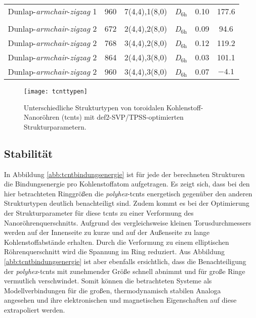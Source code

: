 \begin{table}[htbp!]
{\begin{tabular}{lccccS[table-format = 3.1]}
    Dunlap-\textit{armchair}-\textit{zigzag} 1& 960   & 7(4,4),1(8,0) & \textit{D}$_{6\text{h}}$   & 0.10  & 177.6 \\
          &       &       &       &       &  \\
    Dunlap-\textit{armchair}-\textit{zigzag} 2& 672   & 2(4,4),2(8,0) & \textit{D}$_{6\text{h}}$   & 0.09  & 94.6 \\
    Dunlap-\textit{armchair}-\textit{zigzag} 2& 768   & 3(4,4),2(8,0) & \textit{D}$_{6\text{h}}$   & 0.12  & 119.2 \\
    Dunlap-\textit{armchair}-\textit{zigzag} 2& 864   & 2(4,4),3(8,0) & \textit{D}$_{6\text{h}}$   & 0.03  & 101.1 \\
    Dunlap-\textit{armchair}-\textit{zigzag} 2& 960   & 3(4,4),3(8,0) & \textit{D}$_{6\text{h}}$   & 0.07  & $\num{-4.1}$ \\
    \end{tabular}}%
  \label{tab:tcnt}%
\end{table}%
\vfill
\FloatBarrier
\newpage

\begin{figure}[ht!]
	\centering
	\texttt{[image: tcnttypen]}
	\captionsetup{figurewithin = chapter}
	\captionsetup{font=small, labelfont=bf}\caption[Strukturtypen von toroidalen Kohlenstoff-Nanoröhren]{Unterschiedliche Strukturtypen von toroidalen Kohlenstoff-Nanoröhren (\acp{tcnt}) mit def2-SVP/TPSS-optimierten Strukturparametern.}
\label{abb:tcnttypen}
\end{figure}

\subsection{Stabilität}
In Abbildung \ref{abb:tcntbindungsenergie} ist für jede der berechneten Strukturen die Bindungsenergie pro Kohlenstoffatom aufgetragen. Es zeigt sich, dass bei den hier betrachteten Ringgrößen die \textit{polyhex}-\acp{tcnt} energetisch gegenüber den anderen Strukturtypen deutlich benachteiligt sind. Zudem kommt es bei der Optimierung der Strukturparameter für diese \acp{tcnt} zu einer Verformung des Nanoröhrenquerschnitts. Aufgrund des vergleichsweise kleinen Torusdurchmessers werden auf der Innenseite zu kurze und auf der Außenseite zu lange Kohlenstoffabstände erhalten. Durch die Verformung zu einem elliptischen Röhrenquerschnitt wird die Spannung im Ring reduziert. Aus Abbildung \ref{abb:tcntbindungsenergie} ist aber ebenfalls ersichtlich, dass die Benachteiligung der \textit{polyhex}-\acp{tcnt} mit zunehmender Größe schnell abnimmt und für große Ringe vermutlich verschwindet. Somit können die betrachteten Systeme als Modellverbindungen für die großen, thermodynamisch stabilen Analoga angesehen und ihre elektronischen und magnetischen Eigenschaften auf diese extrapoliert werden.

